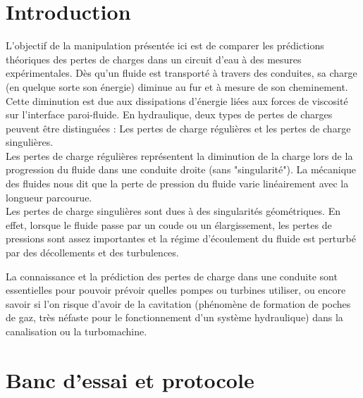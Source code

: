 \documentclass[12pt, a4paper, twoside]{article} %
\begin{document}
\clearpage
\section{Introduction } 

L'objectif de la manipulation présentée ici est de comparer les prédictions théoriques des pertes de charges dans un circuit d'eau à des mesures expérimentales. Dès qu'un fluide est transporté à travers des conduites, sa charge (en quelque sorte son énergie) diminue au fur et à mesure de son cheminement. Cette diminution est due aux dissipations d'énergie liées aux forces de viscosité sur l'interface paroi-fluide. 
En hydraulique, deux types de pertes de charges peuvent être distinguées : Les pertes de charge régulières et les pertes de charge singulières. \\
Les pertes de charge régulières représentent la diminution de la charge lors de la progression du fluide dans une conduite droite (sans "singularité"). La mécanique des fluides nous dit que la perte de pression du fluide varie linéairement avec la longueur parcourue. 
\\ Les pertes de charge singulières sont dues à des singularités géométriques. En effet, lorsque le fluide passe par un coude ou un élargissement, les pertes de pressions sont assez importantes et la régime d'écoulement du fluide est perturbé par des décollements et des turbulences.

La connaissance et la prédiction des pertes de charge dans une conduite sont essentielles pour pouvoir prévoir quelles pompes ou turbines utiliser, ou encore savoir si l'on risque d'avoir de la cavitation (phénomène de formation de poches de gaz, très néfaste pour le fonctionnement d'un système hydraulique) dans la canalisation ou la turbomachine.


\section{Banc d'essai et protocole }
\end{document}
